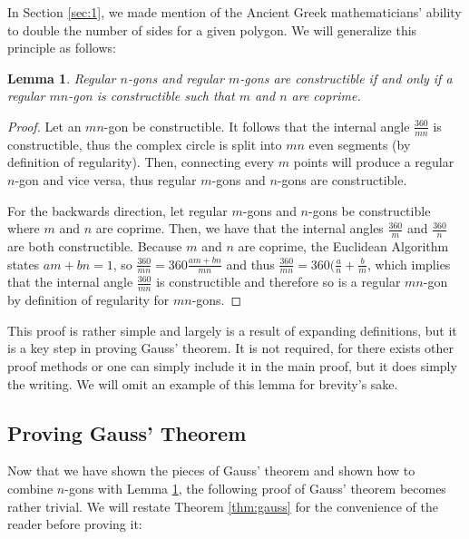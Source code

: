 \documentclass[reqno]{amsart}
\newtheorem{lemma}[theorem]{Lemma}
\theoremstyle{definition}
\numberwithin{equation}{section}
\begin{document}
In Section \ref{sec:1}, we made mention of the Ancient Greek mathematicians' ability to double the number of sides for a given polygon. We will generalize this principle as follows:
\begin{lemma}\label{lem:4}
Regular $n$-gons and regular $m$-gons are constructible if and only if a regular $mn$-gon is constructible such that $m$ and $n$ are coprime.
\end{lemma}
\begin{proof}
Let an $mn$-gon be constructible. It follows that the internal angle $\frac{360}{mn}$ is constructible, thus the complex circle is split into $mn$ even segments (by definition of regularity). Then, connecting every $m$ points will produce a regular $n$-gon and vice versa, thus regular $m$-gons and $n$-gons are constructible.

For the backwards direction, let regular $m$-gons and $n$-gons be constructible where $m$ and $n$ are coprime. Then, we have that the internal angles $\frac{360}{m}$ and $\frac{360}{n}$ are both constructible. Because $m$ and $n$ are coprime, the Euclidean Algorithm states $am + bn = 1$, so $\frac{360}{mn} = 360\frac{am + bn}{mn}$ and thus $\frac{360}{mn} = 360(\frac{a}{n} + \frac{b}{m}$, which implies that the internal angle $\frac{360}{mn}$ is constructible and therefore so is a regular $mn$-gon by definition of regularity for $mn$-gons.
\end{proof}
This proof is rather simple and largely is a result of expanding definitions, but it is a key step in proving Gauss' theorem. It is not required, for there exists other proof methods or one can simply include it in the main proof, but it does simply the writing. We will omit an example of this lemma for brevity's sake.

\subsection{Proving Gauss' Theorem}

Now that we have shown the pieces of Gauss' theorem and shown how to combine $n$-gons with Lemma \ref{lem:4}, the following proof of Gauss' theorem becomes rather trivial. We will restate Theorem \ref{thm:gauss} for the convenience of the reader before proving it:
\end{document}
